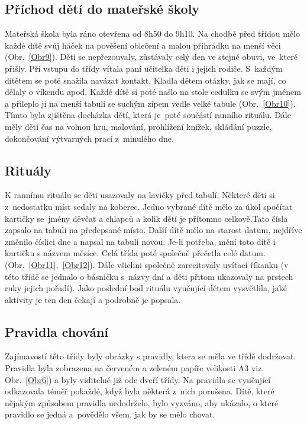 		\subsection{Příchod dětí do mateřské školy}
		\label{prichod}
			Mateřská škola byla ráno otevřena od 8h50 do 9h10. Na chodbě před třídou mělo každé dítě svůj háček na pověšení oblečení a malou přihrádku na menší věci (Obr.~\ref{Obr9}). Děti se nepřezouvaly, zůstávaly celý den ve stejné obuvi, ve které přišly. Při vstupu do třídy vítala paní učitelka děti i jejich rodiče. S každým dítětem se poté snažila navázat kontakt. Kladla dětem otázky, jak se mají, co dělaly o víkendu apod. Každé dítě si poté našlo na stole cedulku se svým jménem a přileplo ji na menší tabuli se suchým zipem vedle velké tabule (Obr.~\ref{Obr10}). Tímto byla zjištěna docházka dětí, která je poté součástí ranního rituálu. Dále měly děti čas na volnou hru, malování, prohlížení knížek, skládání puzzle, dokončování výtvarných prací z minulého dne.
		
		\subsection{Rituály}
		\label{ritualy}
			K rannímu rituálu se děti usazovaly na lavičky před tabulí. Některé děti si z nedostatku míst sedaly na koberec. Jedno vybrané dítě mělo za úkol spočítat kartičky se jmény děvčat a chlapců a kolik dětí je přítomno celkově.Tato čísla zapsalo na tabuli na předepsané místo. Další dítě mělo na starost datum, nejdříve změnilo číslici dne a napsal na tabuli novou. Je-li potřeba, mění toto dítě i kartičku s názvem měsíce. Celá třída poté společně přečetla celé datum. (Obr.~\ref{Obr11},~\ref{Obr12}). Dále všichni společně zarecitovaly uvítací říkanku (v této třídě se jednalo o básničku s názvy dní a děti přitom ukazovaly na prstech ruky jejich pořadí). Jako poslední bod rituálu vyučující dětem vysvětlila, jaké aktivity je ten den čekají a podrobně je popsala. 

		\subsection{Pravidla chování}
		\label{pravidlaChovani}
			Zajímavostí této třídy byly obrázky s pravidly, ktera se měla ve třídě dodržovat. Pravidla byla zobrazena na červeném a zeleném papíře velikosti A3 viz. Obr.~\ref{Obr6}) a byly viditelné již ode dveří třídy. Na pravidla se vyučující odkazovala téměř pokaždé, když byla některá z nich porušena. Dítě, které nějakým způsobem pravidla nedodrželo, bylo vyzváno, aby ukázalo, o které pravidlo se jedná a povědělo všem, jak by se mělo chovat. 

